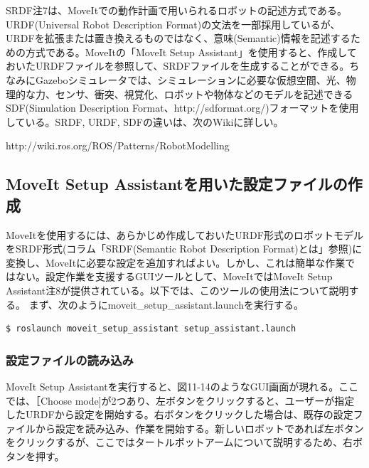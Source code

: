 \begin{exercise}
SRDF注7は、MoveItでの動作計画で用いられるロボットの記述方式である。URDF(Universal Robot Description Format)の文法を一部採用しているが、URDFを拡張または置き換えるものではなく、意味(Semantic)情報を記述するための方式である。MoveItの「MoveIt Setup Assistant」を使用すると、作成しておいたURDFファイルを参照して、SRDFファイルを生成することができる。ちなみにGazeboシミュレータでは、シミュレーションに必要な仮想空間、光、物理的な力、センサ、衝突、視覚化、ロボットや物体などのモデルを記述できるSDF(Simulation Description Format、http://sdformat.org/)フォーマットを使用している。SRDF, URDF, SDFの違いは、次のWikiに詳しい。

http://wiki.ros.org/ROS/Patterns/RobotModelling
\end{exercise}

\subsection{MoveIt Setup Assistantを用いた設定ファイルの作成}

MoveItを使用するには、あらかじめ作成しておいたURDF形式のロボットモデルをSRDF形式(コラム「SRDF(Semantic Robot Description Format)とは」参照)に変換し、MoveItに必要な設定を追加すればよい。しかし、これは簡単な作業ではない。設定作業を支援するGUIツールとして、MoveItではMoveIt Setup Assistant注8が提供されている。以下では、このツールの使用法について説明する。
まず、次のようにmoveit\_setup\_assistant.launchを実行する。

\begin{lstlisting}[language=ROS]
$ roslaunch moveit_setup_assistant setup_assistant.launch
\end{lstlisting}

\subsubsection{設定ファイルの読み込み}

MoveIt Setup Assistantを実行すると、図11-14のようなGUI画面が現れる。ここでは、［Choose mode]が2つあり、左ボタンをクリックすると、ユーザーが指定したURDFから設定を開始する。右ボタンをクリックした場合は、既存の設定ファイルから設定を読み込み、作業を開始する。新しいロボットであれば左ボタンをクリックするが、ここではタートルボットアームについて説明するため、右ボタンを押す。

